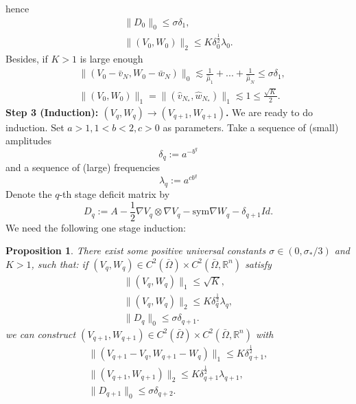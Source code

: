 \documentclass[reqno,12pt]{amsart}
\numberwithin{equation}{section}
\theoremstyle{plain}
\newtheorem{prop}[thm]{Proposition}
\theoremstyle{definition}
\newcommand{\R}{\mathbb{R}}
\newcommand{\sym}{\text{sym}}
\begin{document}
hence
\begin{gather}
    \| D_0\|_0\le {\sigma}\delta_1, \label{011}\\
    \|(V_0,W_0)\|_2\le K\delta_0^\frac{1}{2}\lambda_0.\label{012}
\end{gather}
Besides, if $K>1$ is large enough
\begin{align}
    &\|(V_0-\bar v_N,W_0-\bar w_N)\|_0\lesssim \frac{1}{\hat\mu_1}+...+\frac{1}{\hat\mu_N}\le\sigma\delta_1,\label{013}\\
    &\|(V_0,W_0)\|_1=\|(\hat v_{N_*},\hat w_{N_*})\|_1\lesssim 1\le \frac{\sqrt{K}}{2}\label{014}.
\end{align}
\textbf{Step 3 (Induction): $(V_q,W_q)\to( V_{q+1},W_{q+1})$.}
We are ready to do induction. Set $a>1,1<b<2,c>0$ as parameters. Take a sequence of (small) amplitudes
\begin{equation}
    \delta_q:=a^{-b^q}
\end{equation}
and a sequence of (large) frequencies
\begin{equation}
    \lambda_q:=a^{cb^q}
\end{equation}
Denote the $q$-th stage deficit matrix by
\begin{equation}\label{881}
   D_q:= A-\frac{1}{2}\nabla V_q\otimes\nabla V_q-\sym\nabla W_q-\delta_{q+1}Id.
\end{equation}
We need the following one stage induction:
\begin{prop}\label{prop1}
    There exist some positive universal constants $\sigma\in(0,\sigma_*/3)$ and $K>1$, such that: if $(V_q,W_q)\in C^2(\bar\Omega)\times C^2(\bar\Omega,\R^n)$ satisfy
    \begin{gather}
         \|(V_q,W_q)\|_1\le \sqrt{K}, \label{prop1.a1}\\
         \|(V_q,W_q)\|_2\le K\delta_q^\frac{1}{2}\lambda_q, \label{prop1.a2}\\
         \|D_q\|_0\le{\sigma}\delta_{q+1}. \label{prop1.a3}
    \end{gather}
    we can construct $(V_{q+1},W_{q+1})\in C^2(\bar\Omega)\times C^2(\bar\Omega,\R^n)$ with
    \begin{gather}
        \|(V_{q+1}-V_q, W_{q+1}-W_q)\|_1\le K\delta_{q+1}^\frac{1}{2}, \label{prop1.0}\\
        \|(V_{q+1},W_{q+1})\|_2\le K\delta_{q+1}^\frac{1}{2}\lambda_{q+1},\label{prop1.1}\\
         \|D_{q+1}\|_0\le{\sigma}\delta_{q+2}.\label{prop1.2}
    \end{gather}
\end{prop} 
\end{document}
